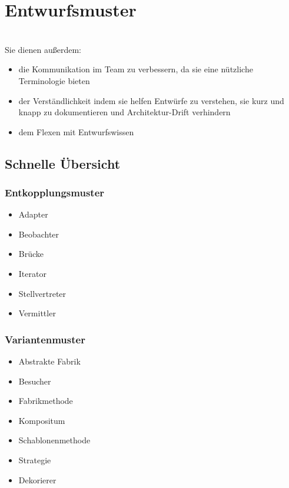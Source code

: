 \section{Entwurfsmuster}
\\
Sie dienen außerdem:
\begin{itemize}
    \item die Kommunikation im Team zu verbessern, da sie eine nützliche Terminologie bieten
    \item der Verständlichkeit indem sie helfen Entwürfe zu verstehen, sie kurz und knapp zu dokumentieren und Architektur-Drift verhindern
    \item dem Flexen mit Entwurfswissen
\end{itemize}

\subsection{Schnelle Übersicht}
\subsubsection{Entkopplungsmuster}
\begin{itemize}
    \item Adapter
    \item Beobachter
    \item Brücke
    \item Iterator
    \item Stellvertreter
    \item Vermittler
\end{itemize}
\subsubsection{Variantenmuster}
\begin{itemize}
    \item Abstrakte Fabrik
    \item Besucher
    \item Fabrikmethode
    \item Kompositum
    \item Schablonenmethode
    \item Strategie
    \item Dekorierer
\end{itemize}
